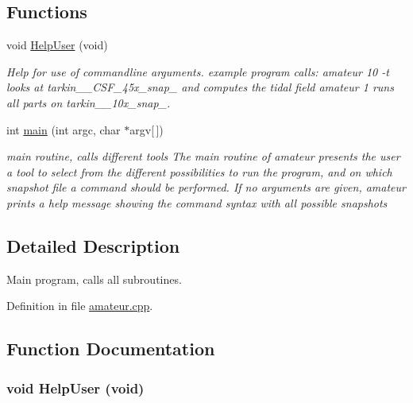 \subsection*{Functions}
\begin{DoxyCompactItemize}
\item 
void \hyperlink{amateur_8cpp_a768cfd4d2507c92b75833be6554c509f}{HelpUser} (void)
\begin{DoxyCompactList}\small\item\em Help for use of commandline arguments. example program calls: amateur 10 -\/t looks at tarkin\_\_\-CSF\_\-45x\_\-snap\_ and computes the tidal field amateur 1 runs all parts on tarkin\_\_\-10x\_\-snap\_. \item\end{DoxyCompactList}\item 
int \hyperlink{amateur_8cpp_a0ddf1224851353fc92bfbff6f499fa97}{main} (int argc, char $\ast$argv\mbox{[}$\,$\mbox{]})
\begin{DoxyCompactList}\small\item\em main routine, calls different tools The main routine of amateur presents the user a tool to select from the different possibilities to run the program, and on which snapshot file a command should be performed. If no arguments are given, amateur prints a help message showing the command syntax with all possible snapshots \item\end{DoxyCompactList}\end{DoxyCompactItemize}


\subsection{Detailed Description}
Main program, calls all subroutines. 

Definition in file \hyperlink{amateur_8cpp_source}{amateur.cpp}.



\subsection{Function Documentation}
\subsubsection[{HelpUser}]{\setlength{\rightskip}{0pt plus 5cm}void HelpUser (void)}\label{amateur_8cpp_a768cfd4d2507c92b75833be6554c509f}


